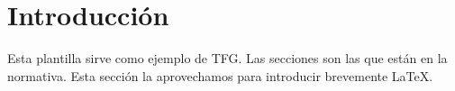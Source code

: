 \documentclass[12pt,a4paper,twoside]{book}
\begin{document}
\makeatother
\thispagestyle{empty}
\newpage
\thispagestyle{empty}







\setcounter{page}{1}
\tableofcontents
\newpage
\listoftables
\newpage
\listoffigures
\newpage




\pagestyle{fancy}
\setcounter{page}{1}

\chapter{Introducción}
Esta plantilla sirve como ejemplo de TFG. Las secciones son las que están en la normativa. Esta sección la aprovechamos para introducir brevemente \LaTeX.
\par
\end{document}
